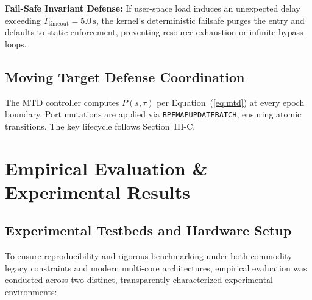 \documentclass{ieeeaccess}
\renewcommand{\_}{\textunderscore\allowbreak}
\begin{document}
\textbf{Fail-Safe Invariant Defense:}
If user-space load induces an unexpected delay exceeding $T_{\text{timeout}} = 5.0\,\text{s}$, the kernel's deterministic failsafe purges the entry and defaults to static enforcement, preventing resource exhaustion or infinite bypass loops.

\subsection{Moving Target Defense Coordination}
The MTD controller computes $P(s, \tau)$ per Equation~(\ref{eq:mtd}) at every
epoch boundary. Port mutations are applied via \texttt{BPF\_MAP\_UPDATE\_BATCH},
ensuring atomic transitions. The key lifecycle follows Section~III-C.

\section{Empirical Evaluation \& Experimental Results}
\subsection{Experimental Testbeds and Hardware Setup}
To ensure reproducibility and rigorous benchmarking under both commodity legacy constraints and modern multi-core architectures, empirical evaluation was conducted across two distinct, transparently characterized experimental environments:
\end{document}

